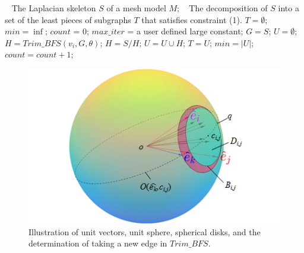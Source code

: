 \begin{algorithm}
\caption{$SkeletonDecomposition(S, M)$}
\label{alg:Framwork}
\begin{algorithmic}[1]
\REQUIRE~
The Laplacian skeleton $S$ of a mesh model $M$;
\ENSURE~
The decomposition of $S$ into a set of the least pieces of subgraphs $T$ that satisfies constraint (1).
\STATE $T = \emptyset$; $min = \inf$; $count$ = 0; $max\_iter$ = a user defined large constant;
\STATE  $G=S$; $U= \emptyset$;
\STATE $H = Trim\_BFS(v_i, G, \theta)$;
\STATE $H = S / H$;
\STATE $U = U \cup H$;
\STATE $T = U$;
\STATE  $min = | U | $;
\ENDIF
\ENDFOR
\ENDWHILE
\STATE $count =count + 1$;
\ENDWHILE
\label{code:fram:select} \\
\end{algorithmic}
\end{algorithm}







\begin{figure}[tbp]
  \centering
  \includegraphics[width=\linewidth]{figs/take_arc.png}
  \caption{\label{fig:sphere}%
           Illustration of unit vectors, unit sphere, spherical disks, and the determination of taking a new edge in $Trim\_BFS$.}
\end{figure}

